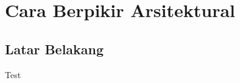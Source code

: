 \chapter{Cara Berpikir Arsitektural}

\section{Latar Belakang}
Test \cite{richards2020fundamentals}

